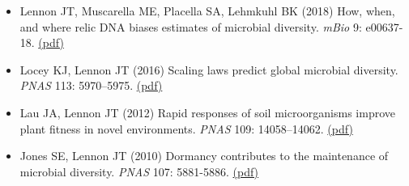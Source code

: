 \documentclass[11pt]{article}  %
\begin{document}
\begin{itemize}[leftmargin=*, label={}, itemsep=1em]
\item Lennon JT, Muscarella ME, Placella SA, Lehmkuhl BK (2018) How, when, and where relic DNA biases estimates of microbial diversity. \textit{mBio} 9: e00637-18. \href{https://lennonlab.github.io/assets/publications/Lennon_etal_2018.pdf}{(pdf)}

\item Locey KJ, Lennon JT (2016) Scaling laws predict global microbial diversity. \textit{PNAS} 113: 5970–5975. \href{https://lennonlab.github.io/assets/publications/Locey_Lennon_2016.pdf}{(pdf)}

\item Lau JA, Lennon JT (2012) Rapid responses of soil microorganisms improve plant fitness in novel environments. \textit{PNAS} 109: 14058–14062. \href{https://lennonlab.github.io/assets/publications/Lau_Lennon_2012.pdf}{(pdf)}

\item Jones SE, Lennon JT (2010) Dormancy contributes to the maintenance of microbial diversity. \textit{PNAS} 107: 5881-5886. \href{https://lennonlab.github.io/assets/publications/Jones_Lennon_2010.pdf}{(pdf)}

\end{itemize}


\end{document}
